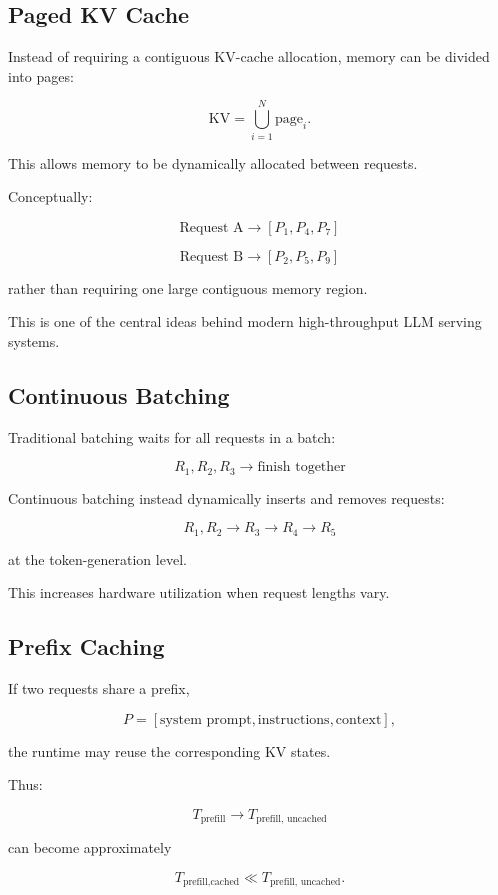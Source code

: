\documentclass[11pt,a4paper]{article}
\begin{document}
\subsection{Paged KV Cache}

Instead of requiring a contiguous KV-cache allocation, memory can
be divided into pages:

\[
\mathrm{KV}
=
\bigcup_{i=1}^{N}\mathrm{page}_i.
\]

This allows memory to be dynamically allocated between requests.

Conceptually:

\[
\text{Request A}
\rightarrow
[P_1,P_4,P_7]
\]

\[
\text{Request B}
\rightarrow
[P_2,P_5,P_9]
\]

rather than requiring one large contiguous memory region.

This is one of the central ideas behind modern high-throughput
LLM serving systems.

\subsection{Continuous Batching}

Traditional batching waits for all requests in a batch:

\[
\boxed{
R_1,R_2,R_3
\rightarrow
\text{finish together}
}
\]

Continuous batching instead dynamically inserts and removes
requests:

\[
\boxed{
R_1,R_2
\rightarrow
R_3
\rightarrow
R_4
\rightarrow
R_5
}
\]

at the token-generation level.

This increases hardware utilization when request lengths vary.

\subsection{Prefix Caching}

If two requests share a prefix,

\[
P =
[\text{system prompt},\text{instructions},\text{context}],
\]

the runtime may reuse the corresponding KV states.

Thus:

\[
T_{\text{prefill}}
\rightarrow
T_{\text{prefill, uncached}}
\]

can become approximately

\[
T_{\text{prefill,cached}}
\ll
T_{\text{prefill, uncached}}.
\]
\end{document}
